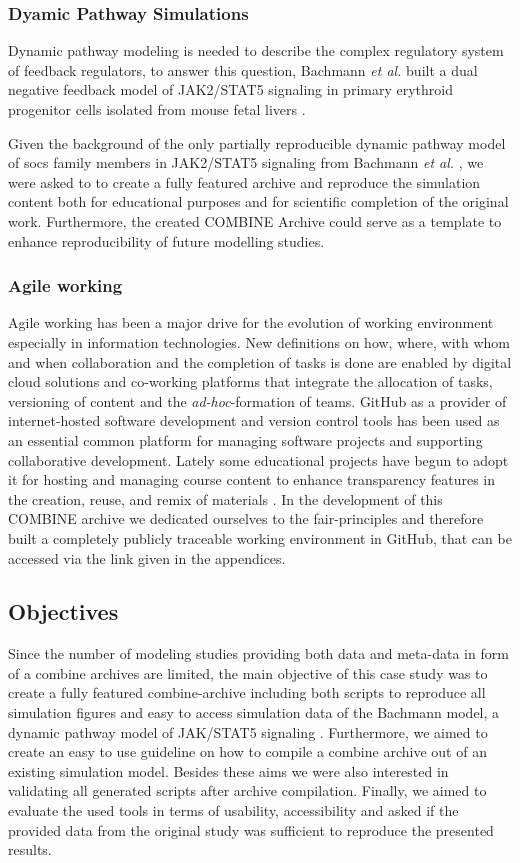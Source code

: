 \subsubsection*{Dyamic Pathway Simulations}
Dynamic pathway modeling is needed to describe the complex regulatory system of feedback regulators, to answer this question, Bachmann \textit{et al.} built a dual negative feedback model of JAK2/STAT5 signaling in primary erythroid progenitor cells isolated from mouse fetal livers \cite{bachmannmodel}.

Given the background of the only partially reproducible dynamic pathway model of \ac{socs} family members in JAK2/STAT5 signaling from Bachmann \textit{et al.} \cite{bachmannmodel}, we  were asked to  to create a fully featured archive and reproduce the simulation content both for educational purposes and for scientific completion of the original work. Furthermore, the created COMBINE Archive could serve as a template to enhance reproducibility of future modelling studies.

\subsubsection*{Agile working}
Agile working has been a major drive for the evolution of working environment especially in information technologies. New definitions on how, where, with whom and when collaboration and the completion of tasks is done are enabled by digital cloud solutions and co-working platforms that integrate the allocation of tasks, versioning of content and the \textit{ad-hoc}-formation of teams. GitHub as a provider of internet-hosted software development and version control tools has been used as an essential common platform for managing software projects and supporting collaborative development. Lately some educational projects have begun to adopt it for hosting and managing course content to enhance transparency features in the creation, reuse, and remix of materials \cite{github, Knegendorf.}. In the development of this COMBINE archive we dedicated ourselves to the \acs{fair}-principles and therefore built a completely publicly traceable working environment in GitHub, that can be accessed via the link given in the appendices.

\subsection*{Objectives}
Since the number of modeling studies providing both data and meta-data in form of a \ac{combine} archives are limited, the main objective of this case study was to create a fully featured \acs{combine}-archive including both scripts to reproduce all simulation figures and easy to access simulation data of the Bachmann model, a dynamic pathway model of JAK/STAT5 signaling \cite{bachmannmodel}. Furthermore, we aimed to create an easy to use guideline on how to compile a \acs{combine} archive out of an existing simulation model. Besides these aims we were also interested in validating all generated scripts after archive compilation. Finally, we aimed to evaluate the used tools in terms of usability, accessibility and asked if the provided data from the original study was sufficient to reproduce the presented results.

